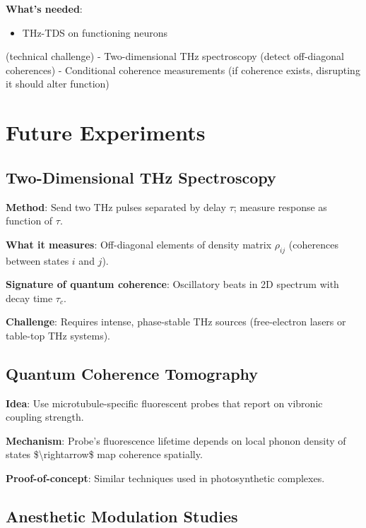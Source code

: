\textbf{What's needed}:
\begin{itemize}
\item THz-TDS on functioning neurons
\end{itemize}

(technical challenge) - Two-dimensional THz spectroscopy (detect
off-diagonal coherences) - Conditional coherence measurements (if
coherence exists, disrupting it should alter function)



\section{Future Experiments}\label{future-experiments}

\subsection{Two-Dimensional THz Spectroscopy}\label{two-dimensional-thz-spectroscopy}

\textbf{Method}: Send two THz pulses separated by delay \(\tau\);
measure response as function of \(\tau\).

\textbf{What it measures}: Off-diagonal elements of density matrix
\(\rho_{ij}\) (coherences between states \(i\) and \(j\)).

\textbf{Signature of quantum coherence}: Oscillatory beats in 2D
spectrum with decay time \(\tau_c\).

\textbf{Challenge}: Requires intense, phase-stable THz sources
(free-electron lasers or table-top THz systems).

\subsection{Quantum Coherence Tomography}\label{quantum-coherence-tomography}

\textbf{Idea}: Use microtubule-specific fluorescent probes that report
on vibronic coupling strength.

\textbf{Mechanism}: Probe's fluorescence lifetime
depends on local phonon density of states \$\textbackslash rightarrow\$
map coherence spatially.

\textbf{Proof-of-concept}: Similar techniques used in photosynthetic
complexes.

\subsection{Anesthetic Modulation Studies}\label{anesthetic-modulation-studies}

